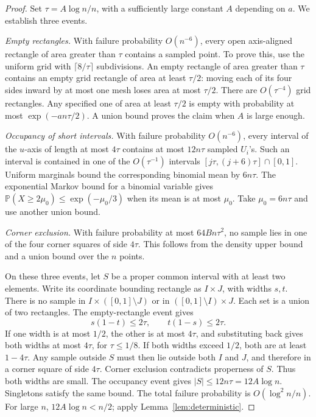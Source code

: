 \documentclass[11pt]{article}
\theoremstyle{remark}
\newcommand{\Prob}{\mathbb P}
\numberwithin{equation}{section}
\begin{document}
\begin{proof}
Set $\tau=A\log n/n$, with a sufficiently large constant $A$ depending
on $a$. We establish three events.

\emph{Empty rectangles.}
With failure probability $O(n^{-6})$, every open axis-aligned rectangle
of area greater than $\tau$ contains a sampled point.
To prove this, use the uniform grid with
$\lceil8/\tau\rceil$ subdivisions.
An empty rectangle of area greater than $\tau$ contains an empty
grid rectangle of area at least $\tau/2$: moving each of its four
sides inward by at most one mesh loses area at most $\tau/2$.
There are $O(\tau^{-4})$ grid rectangles.
Any specified one of area at least $\tau/2$ is empty with probability
at most $\exp(-an\tau/2)$.
A union bound proves the claim when $A$ is large enough.

\emph{Occupancy of short intervals.}
With failure probability $O(n^{-6})$, every interval of the $u$-axis
of length at most $4\tau$ contains at most $12n\tau$ sampled
$U_i$'s.
Such an interval is contained in one of the $O(\tau^{-1})$ intervals
$[j\tau,(j+6)\tau]\cap[0,1]$.
Uniform marginals bound the corresponding binomial mean by $6n\tau$.
The exponential Markov bound for a binomial variable gives
$\Prob(X\ge2\mu_0)\le\exp(-\mu_0/3)$ when its mean is at most $\mu_0$.
Take $\mu_0=6n\tau$ and use another union bound.

\emph{Corner exclusion.}
With failure probability at most $64Bn\tau^2$, no sample lies in
one of the four corner squares of side $4\tau$.
This follows from the density upper bound and a union bound over
the $n$ points.

On these three events, let $S$ be a proper common interval with at
least two elements. Write its coordinate bounding rectangle as
$I\times J$, with widths $s,t$.
There is no sample in
$I\times([0,1]\setminus J)$ or in
$([0,1]\setminus I)\times J$.
Each set is a union of two rectangles. The empty-rectangle event gives
\[
 s(1-t)\le2\tau,\qquad t(1-s)\le2\tau.
\]
If one width is at most $1/2$, the other is at most $4\tau$,
and substituting back gives both widths at most $4\tau$, for
$\tau\le1/8$.
If both widths exceed $1/2$, both are at least $1-4\tau$.
Any sample outside $S$ must then lie outside both $I$ and $J$,
and therefore in a corner square of side $4\tau$.
Corner exclusion contradicts properness of $S$.
Thus both widths are small. The occupancy event gives
$|S|\le12n\tau=12A\log n$.
Singletons satisfy the same bound.
The total failure probability is $O(\log^2n/n)$.
For large $n$, $12A\log n<n/2$; apply
Lemma~\ref{lem:deterministic}.
\end{proof}
\end{document}
